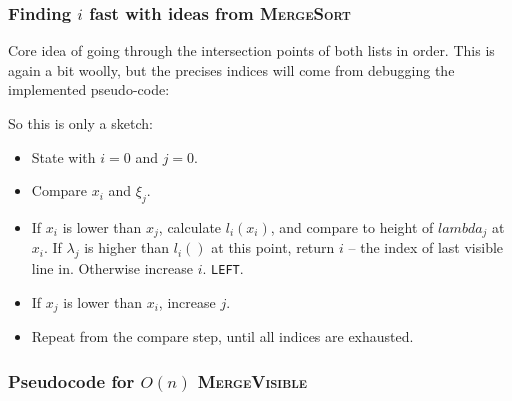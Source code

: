 \documentclass{article}
\begin{document}
\begin{frame}
  \frametitle{Finding $i$ fast with ideas from \textsc{MergeSort}}
  
  Core idea of going through the intersection points of both lists in
  order. This is again a bit woolly, but the precises indices will
  come from debugging the implemented pseudo-code:

  So this is only a sketch:
  \begin{itemize}
  \item State with $i = 0$ and $j=0$.
  \item Compare $x_i$ and $\xi_j$. 
  \item If $x_i$ is lower than $x_j$, calculate $l_i(x_i)$, and compare to height
    of $lambda_{j}$ at $x_i$. If $\lambda_{j}$ is higher than $l_i()$
    at this point, return $i$ -- the index of last visible line
    in. Otherwise increase $i$.
    \texttt{LEFT}.
  \item If $x_j$ is lower than $x_i$, increase $j$.
  \item Repeat from the compare step, until all indices are exhausted.
  \end{itemize}
\end{frame}

\begin{frame}
  \frametitle{Pseudocode for $O(n)$ \textsc{MergeVisible}}
  \begin{algorithmic}
    \EndProcedure
  \end{algorithmic}
\end{frame}
\end{document}
